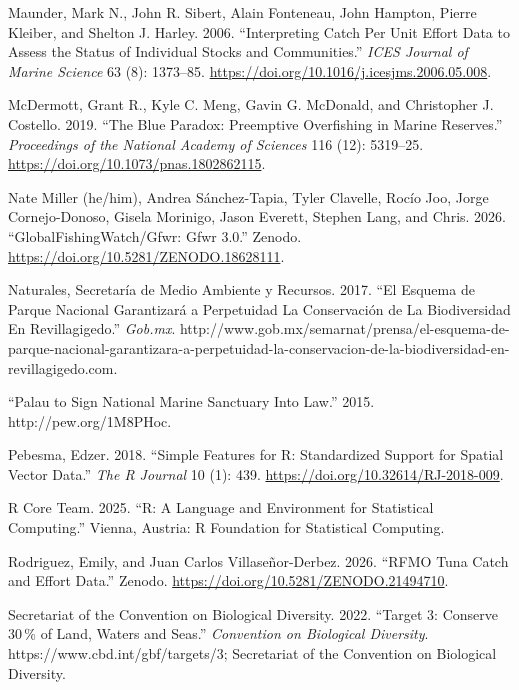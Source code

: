 \documentclass[
  letterpaper,
  DIV=11,
  numbers=noendperiod]{scrartcl}
\newlength{\cslhangindent}
\newenvironment{CSLReferences}[2] %
 {\begin{list}{}{%
  \setlength{\itemindent}{0pt}
  \setlength{\leftmargin}{0pt}
  \setlength{\parsep}{0pt}
  \ifodd #1
   \setlength{\leftmargin}{\cslhangindent}
   \setlength{\itemindent}{-1\cslhangindent}
  \fi
  \setlength{\itemsep}{#2\baselineskip}}}
 {\end{list}}
\begin{document}
\begin{CSLReferences}{1}{0}
Maunder, Mark N., John R. Sibert, Alain Fonteneau, John Hampton, Pierre
Kleiber, and Shelton J. Harley. 2006. {``Interpreting Catch Per Unit
Effort Data to Assess the Status of Individual Stocks and
Communities.''} \emph{ICES Journal of Marine Science} 63 (8): 1373--85.
\url{https://doi.org/10.1016/j.icesjms.2006.05.008}.

McDermott, Grant R., Kyle C. Meng, Gavin G. McDonald, and Christopher J.
Costello. 2019. {``The Blue Paradox: {Preemptive} Overfishing in Marine
Reserves.''} \emph{Proceedings of the National Academy of Sciences} 116
(12): 5319--25. \url{https://doi.org/10.1073/pnas.1802862115}.

Nate Miller (he/him), Andrea Sánchez-Tapia, Tyler Clavelle, Rocío Joo,
Jorge Cornejo-Donoso, Gisela Morinigo, Jason Everett, Stephen Lang, and
Chris. 2026. {``{GlobalFishingWatch}/Gfwr: Gfwr 3.0.''} Zenodo.
\url{https://doi.org/10.5281/ZENODO.18628111}.

Naturales, Secretaría de Medio Ambiente y Recursos. 2017. {``El Esquema
de {Parque Nacional} Garantizará a Perpetuidad La Conservación de La
Biodiversidad En {Revillagigedo}.''} \emph{Gob.mx}.
http://www.gob.mx/semarnat/prensa/el-esquema-de-parque-nacional-garantizara-a-perpetuidad-la-conservacion-de-la-biodiversidad-en-revillagigedo.com.

{``Palau to {Sign National Marine Sanctuary Into Law}.''} 2015.
http://pew.org/1M8PHoc.

Pebesma, Edzer. 2018. {``Simple {Features} for {R}: {Standardized
Support} for {Spatial Vector Data}.''} \emph{The R Journal} 10 (1): 439.
\url{https://doi.org/10.32614/RJ-2018-009}.

R Core Team. 2025. {``R: {A Language} and {Environment} for {Statistical
Computing}.''} Vienna, Austria: R Foundation for Statistical Computing.

Rodriguez, Emily, and Juan Carlos Villaseñor-Derbez. 2026. {``{RFMO Tuna
Catch} and {Effort Data}.''} Zenodo.
\url{https://doi.org/10.5281/ZENODO.21494710}.

Secretariat of the Convention on Biological Diversity. 2022. {``Target
3: {Conserve} 30 \% of {Land}, {Waters} and {Seas}.''} \emph{Convention
on Biological Diversity}. https://www.cbd.int/gbf/targets/3; Secretariat
of the Convention on Biological Diversity.


\end{CSLReferences}
\end{document}
